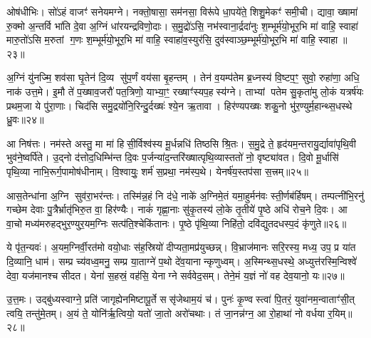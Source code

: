 ओष॑धीभिः। सो॑ऽहं वाजꣳ॑ सनेयमग्ने। नक्तो॒षासा॒ सम॑नसा॒ विरू॑पे धा॒पये॑ते॒ शिशु॒मेकꣳ॑ समी॒ची। द्यावा॒ ख्षामा॑ रु॒क्मो अ॒न्तर्वि भा॑ति दे॒वा अ॒ग्निं धा॑रयन्द्रविणो॒दाः। स॒मु॒द्रो॑ऽसि॒ नभ॑स्वाना॒र्द्रदा॑नुः श॒म्भूर्म॑यो॒भूर॒भि मा॑ वाहि॒ स्वाहा॑ मारु॒तो॑ऽसि म॒रुतां ग॒णः श॒म्भूर्म॑यो॒भूर॒भि मा॑ वाहि॒ स्वाहा॑व॒स्युर॑सि॒ दुव॑स्वाञ्छ॒म्भूर्म॑यो॒भूर॒भि मा॑ वाहि॒ स्वाहा॥२३॥

{\anuvakamend[{धनेष्व॒पो दुव॑स्वाञ्छ॒म्भूर्म॑यो॒भूर॒भि मा॒ द्वे च॑॥12॥}]}

अ॒ग्निं यु॑नज्मि॒ शव॑सा घृ॒तेन॑ दि॒व्य सु॑प॒र्णं वय॑सा बृ॒हन्तम्। तेन॑ व॒यम्प॑तेम ब्र॒ध्नस्य॑ वि॒ष्टप॒ꣳ॒ सुवो॒ रुहा॑णा॒ अधि॒ नाक॑ उत्त॒मे। इ॒मौ ते॑ प॒ख्षाव॒जरौ॑ पत॒त्रिणो॒ याभ्या॒ꣳ॒ रख्षाꣳ॑स्यप॒हस्य॑ग्ने। ताभ्यां पतेम सु॒कृता॑मु लो॒कं यत्रर्\mbox{}ष॑यः प्रथम॒जा ये पु॑रा॒णाः। चिद॑सि समु॒द्रयो॑नि॒रिन्दु॒र्दख्षः॑ श्ये॒न ऋ॒तावा। हिर॑ण्यपख्षः शकु॒नो भु॑र॒ण्युर्म॒हान्थ्स॒धस्थे ध्रु॒वः॥२४॥

आ निष॑त्तः। नम॑स्ते अस्तु॒ मा मा॑ हिसी॒र्विश्व॑स्य मू॒र्धन्नधि॑ तिष्ठसि श्रि॒तः। स॒मु॒द्रे ते॒ हृद॑यम॒न्तरायु॒र्द्यावा॑पृथि॒वी भुव॑ने॒ष्वर्पि॑ते। उ॒द्नो द॑त्तोद॒धिम्भि॑न्त दि॒वः प॒र्जन्या॑द॒न्तरि॑ख्षात्पृथि॒व्यास्ततो॑ नो॒ वृष्ट्या॑वत। दि॒वो मू॒र्धासि॑ पृथि॒व्या नाभि॒रूर्ग॒पामोष॑धीनाम्। वि॒श्वायुः॒ शर्म॑ स॒प्रथा॒ नम॑स्प॒थे। येनर्\mbox{}ष॑य॒स्तप॑सा स॒त्त्रम्॥२५॥

आस॒तेन्धा॑ना अ॒ग्नि सुव॑रा॒भर॑न्तः। तस्मि॑न्न॒हं नि द॑धे॒ नाके॑ अ॒ग्निमे॒तं यमा॒हुर्मन॑वः स्ती॒र्णब॑र्\mbox{}हिषम्। तम्पत्नी॑भि॒रनु॑ गच्छेम देवाः पु॒त्रैर्भ्रातृ॑भिरु॒त वा॒ हिर॑ण्यैः। नाकं॑ गृह्णा॒नाः सु॑कृ॒तस्य॑ लो॒के तृ॒तीये॑ पृ॒ष्ठे अधि॑ रोच॒ने दि॒वः। आ वा॒चो मध्य॑मरुहद्भुर॒ण्युर॒यम॒ग्निः सत्प॑ति॒श्चेकि॑तानः। पृ॒ष्ठे पृ॑थि॒व्या निहि॑तो॒ दवि॑द्युतदधस्प॒दं कृ॑णुते॥२६॥

ये पृ॑त॒न्यवः॑। अ॒यम॒ग्निर्वी॒रत॑मो वयो॒धाः स॑ह॒स्रियो॑ दीप्यता॒मप्र॑युच्छन्न्। वि॒भ्राज॑मानः सरि॒रस्य॒ मध्य॒ उप॒ प्र या॑त दि॒व्यानि॒ धाम॑। सम्प्र च्य॑वध्व॒मनु॒ सम्प्र या॒ताग्ने॑ प॒थो दे॑व॒यानान्कृणुध्वम्। अ॒स्मिन्थ्स॒धस्थे॒ अध्युत्त॑रस्मि॒न्विश्वे॑ देवा॒ यज॑मानश्च सीदत। येना॑ स॒हस्रं॒ वह॑सि॒ येनाग्ने सर्ववेद॒सम्। तेने॒मं य॒ज्ञं नो॑ वह देव॒यानो॒ यः॥२७॥

उ॒त्त॒मः। उद्बु॑ध्यस्वाग्ने॒ प्रति॑ जागृह्येनमिष्टापू॒र्ते ससृ॑जेथाम॒यं च॑। पुनः॑ कृ॒ण्वस्त्वा॑ पि॒तरं॒ युवा॑नम॒न्वाताꣳ॑सी॒त् त्वयि॒ तन्तु॑मे॒तम्। अ॒यं ते॒ योनि॑र्\mbox{}ऋ॒त्वियो॒ यतो॑ जा॒तो अरो॑चथाः। तं जा॒नन्न॑ग्न॒ आ रो॒हाथा॑ नो वर्धया र॒यिम्॥२८॥

{\anuvakamend[{ध्रु॒वः स॒त्रङ्कृ॑णुते॒ यस्स॒प्तत्रिꣳ॑शच्च॥13॥}]}

